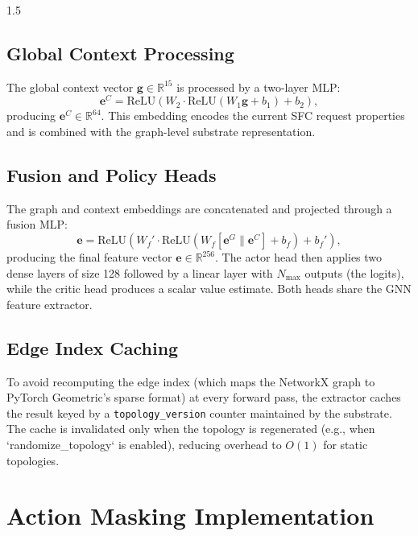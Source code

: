 \documentclass[A4paper,12pt]{report}
\theoremstyle{plain}
\theoremstyle{definition}
\theoremstyle{remark}
\numberwithin{equation}{section}
\begin{document}
\begin{spacing}{1.5}
\subsection{Global Context Processing}

The global context vector $\mathbf{g} \in \mathbb{R}^{15}$ is processed by a two-layer MLP:
\begin{equation}
\mathbf{e}^C = \text{ReLU}(W_2 \cdot \text{ReLU}(W_1 \mathbf{g} + b_1) + b_2),
\end{equation}
producing $\mathbf{e}^C \in \mathbb{R}^{64}$. This embedding encodes the current SFC request properties and is combined with the graph-level substrate representation.

\subsection{Fusion and Policy Heads}

The graph and context embeddings are concatenated and projected through a fusion MLP:
\begin{equation}
\mathbf{e} = \text{ReLU}(W_f' \cdot \text{ReLU}(W_f [\mathbf{e}^G \| \mathbf{e}^C] + b_f) + b_f'),
\end{equation}
producing the final feature vector $\mathbf{e} \in \mathbb{R}^{256}$. The actor head then applies two dense layers of size 128 followed by a linear layer with $N_{\max}$ outputs (the logits), while the critic head produces a scalar value estimate. Both heads share the GNN feature extractor.

\subsection{Edge Index Caching}

To avoid recomputing the edge index (which maps the NetworkX graph to PyTorch Geometric's sparse format) at every forward pass, the extractor caches the result keyed by a \texttt{topology\_version} counter maintained by the substrate. The cache is invalidated only when the topology is regenerated (e.g., when `randomize\_topology` is enabled), reducing overhead to $O(1)$ for static topologies.

\section{Action Masking Implementation}


\end{spacing}
\end{document}
